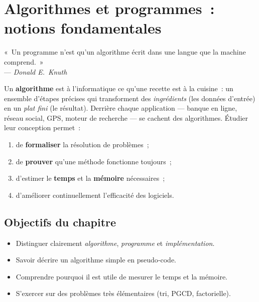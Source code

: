 
\chapter{Algorithmes et programmes : notions fondamentales}

\begin{flushright}\small
« Un programme n’est qu’un algorithme écrit dans une langue que la machine
comprend. »\\[-0.2em]
— \textit{Donald E. Knuth}
\end{flushright}

Un \textbf{algorithme} est à l’informatique ce qu’une recette est à la cuisine : un
ensemble d’étapes précises qui transforment des \emph{ingrédients} (les données
d’entrée) en un \emph{plat fini} (le résultat). Derrière chaque application —
banque en ligne, réseau social, GPS, moteur de recherche — se cachent des
algorithmes. Étudier leur conception permet :
\begin{enumerate}
  \item de \textbf{formaliser} la résolution de problèmes ;              %
  \item de \textbf{prouver} qu’une méthode fonctionne toujours ;        %
  \item d’estimer le \textbf{temps} et la \textbf{mémoire} nécessaires ; %
  \item d’améliorer continuellement l’efficacité des logiciels.          %
\end{enumerate}

\section*{Objectifs du chapitre}
\begin{itemize}[label=\small$\blacktriangleright$]
  \item Distinguer clairement \emph{algorithme}, \emph{programme} et \emph{implémentation}.
  \item Savoir décrire un algorithme simple en pseudo‑code.
  \item Comprendre pourquoi il est utile de mesurer le temps et la mémoire.
  \item S’exercer sur des problèmes très élémentaires (tri, PGCD, factorielle).
\end{itemize}
\vspace{0.5em}

